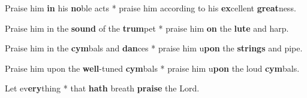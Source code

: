 \begin{multicols}{2}
	Praise him \textbf{in} his \textbf{no}ble acts * praise him according to his \textbf{ex}cellent \textbf{great}ness.
	
	Praise him in the \textbf{sound} of the \textbf{trum}pet * praise him \textbf{on} the \textbf{lute} and harp.
	
	Praise him in the \textbf{cym}bals and \textbf{dan}ces * praise him u\textbf{pon} the \textbf{strings} and pipe.
	
	Praise him upon the \textbf{well}-tuned \textbf{cym}bals * praise him u\textbf{pon} the loud \textbf{cym}bals.
	
	Let ev\textbf{ery}thing * that \textbf{hath} breath \textbf{praise} the Lord.
\end{multicols}